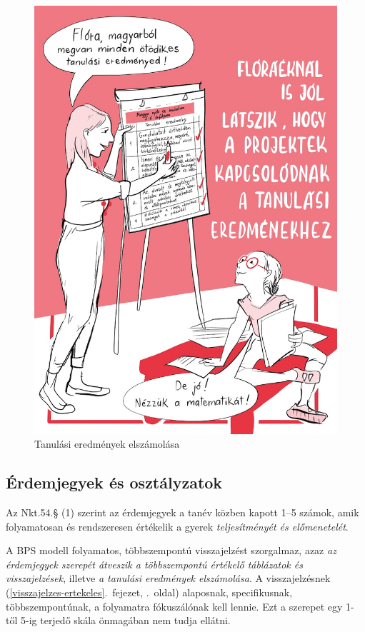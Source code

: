 \begin{figure}
\centering
\includegraphics{pics/6b_tantargyi_flora.jpg}
\caption{Tanulási eredmények elszámolása}
\end{figure}

\hypertarget{erdemjegyek-es-osztalyzatok}{%
\subsection{Érdemjegyek és
osztályzatok}\label{erdemjegyek-es-osztalyzatok}}

Az Nkt.54.§ (1) szerint az érdemjegyek a tanév közben kapott 1--5 számok,
amik folyamatosan és rendszeresen értékelik a gyerek
\emph{teljesítményét és előmenetelét}.

A BPS modell folyamatos, többszempontú visszajelzést szorgalmaz, azaz
\emph{az érdemjegyek szerepét átveszik a többszempontú értékelő táblázatok
és visszajelzések}, illetve \emph{a tanulási eredmények elszámolása}. A
visszajelzésnek (\ref{visszajelzes-ertekeles}.~fejezet, \pageref{visszajelzes-ertekeles}.~oldal)
alaposnak, specifikusnak, többszempontúnak, a folyamatra fókuszálónak
kell lennie. Ezt a szerepet egy 1-től 5-ig terjedő skála önmagában nem
tudja ellátni.

